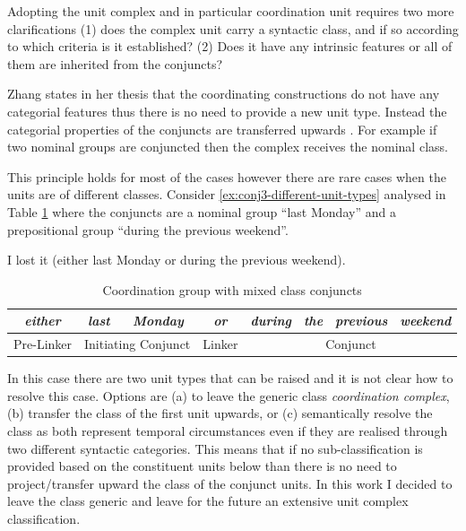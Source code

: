 Adopting the unit complex and in particular coordination unit requires two more clarifications (1) does the complex unit carry a syntactic class, and if so according to which criteria is it established? (2) Does it have any intrinsic features or all of them are inherited from the conjuncts?

Zhang states in her thesis that the coordinating constructions do not have any categorial features thus there is no need to provide a new unit type. Instead the categorial properties of the conjuncts are transferred upwards \citep{NinaZhang2010}. For example if two nominal groups are conjuncted then the complex receives the nominal class.  

This principle holds for most of the cases however there are rare cases when the units are of different classes. Consider \ref{ex:conj3-different-unit-types} analysed in Table \ref{tab:mixed-coordination} where the conjuncts are a nominal group ``last Monday'' and a prepositional group ``during the previous weekend''.

\begin{exe}
	\ex\label{ex:conj3-different-unit-types}
	I lost it (either last Monday or during the previous weekend). 
\end{exe}

\begin{table}[H]
    \centering
    \begin{tabular}{|c|c|c|c|c|c|c|c|}
        \hline
        \textit{either} & \textit{last} & \textit{Monday} & \textit{or} & \textit{during} & \textit{the} & \textit{previous} & \textit{weekend} \\ \hline
        Pre-Linker & \multicolumn{2}{c|}{Initiating Conjunct} & Linker & \multicolumn{4}{c|}{Conjunct} \\ \hline
    \end{tabular}
    \caption{Coordination group with mixed class conjuncts}
    \label{tab:mixed-coordination}
\end{table}

In this case there are two unit types that can be raised and it is not clear how to resolve this case. Options are (a) to leave the generic class \textit{coordination complex}, (b) transfer the class of the first unit upwards, or (c) semantically resolve the class as both represent temporal circumstances even if they are realised through two different syntactic categories. This means that if no sub-classification is provided based on the constituent units below than there is no need to project/transfer upward the class of the conjunct units. In this work I decided to leave the class generic and leave for the future an extensive unit complex classification.

